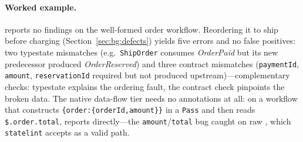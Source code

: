 \paragraph{Worked example.}
\tool{} reports no findings on the well-formed order workflow. Reordering it to ship
before charging (Section~\ref{sec:bg:defects}) yields five errors and no false
positives: two  typestate mismatches (e.g.\ \texttt{ShipOrder} consumes
\emph{OrderPaid} but its new predecessor produced \emph{OrderReserved}) and three
 contract mismatches (\texttt{paymentId}, \texttt{amount},
\texttt{reservationId} required but not produced upstream)---complementary checks:
typestate explains the ordering fault, the contract check pinpoints the broken data.
The native data-flow tier needs no annotations at all: on a workflow that constructs
\texttt{\{order:\{orderId,amount\}\}} in a \texttt{Pass} and then reads
\texttt{\$.order.total}, \tool{} reports  directly---the
\texttt{amount}/\texttt{total} bug caught on raw \asl{}, which \texttt{statelint}
accepts as a valid path.
